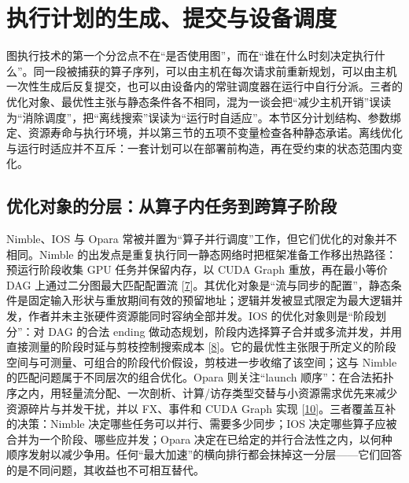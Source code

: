 \documentclass[
  UTF8,
  zihao=5]{ctexart}
\begin{document}
\hypertarget{ux6267ux884cux8ba1ux5212ux7684ux751fux6210ux63d0ux4ea4ux4e0eux8bbeux5907ux8c03ux5ea6}{%
\section{执行计划的生成、提交与设备调度}\label{ux6267ux884cux8ba1ux5212ux7684ux751fux6210ux63d0ux4ea4ux4e0eux8bbeux5907ux8c03ux5ea6}}

图执行技术的第一个分岔点不在``是否使用图''，而在``谁在什么时刻决定执行什么''。同一段被捕获的算子序列，可以由主机在每次请求前重新规划，可以由主机一次性生成后反复提交，也可以由设备内的常驻调度器在运行中自行分派。三者的优化对象、最优性主张与静态条件各不相同，混为一谈会把``减少主机开销''误读为``消除调度''，把``离线搜索''误读为``运行时自适应''。本节区分计划结构、参数绑定、资源寿命与执行环境，并以第三节的五项不变量检查各种静态承诺。离线优化与运行时适应并不互斥：一套计划可以在部署前构造，再在受约束的状态范围内变化。

\hypertarget{ux4f18ux5316ux5bf9ux8c61ux7684ux5206ux5c42ux4eceux7b97ux5b50ux5185ux4efbux52a1ux5230ux8de8ux7b97ux5b50ux9636ux6bb5}{%
\subsection{优化对象的分层：从算子内任务到跨算子阶段}\label{ux4f18ux5316ux5bf9ux8c61ux7684ux5206ux5c42ux4eceux7b97ux5b50ux5185ux4efbux52a1ux5230ux8de8ux7b97ux5b50ux9636ux6bb5}}

Nimble、IOS 与 Opara
常被并置为``算子并行调度''工作，但它们优化的对象并不相同。Nimble
的出发点是重复执行同一静态网络时把框架准备工作移出热路径：预运行阶段收集
GPU 任务并保留内存，以 CUDA Graph 重放，再在最小等价 DAG
上通过二分图最大匹配配置流
{[}\protect\hyperlink{ref-kwon2020nimble}{7}{]}。其优化对象是``流与同步的配置''，静态条件是固定输入形状与重放期间有效的预留地址；逻辑并发被显式限定为最大逻辑并发，作者并未主张硬件资源能同时容纳全部并发。IOS
的优化对象则是``阶段划分''：对 DAG 的合法 ending
做动态规划，阶段内选择算子合并或多流并发，并用直接测量的阶段时延与剪枝控制搜索成本
{[}\protect\hyperlink{ref-ding2021ios}{8}{]}。它的最优性主张限于所定义的阶段空间与可测量、可组合的阶段代价假设，剪枝进一步收缩了该空间；这与
Nimble 的匹配问题属于不同层次的组合优化。Opara 则关注``launch
顺序''：在合法拓扑序之内，用轻量流分配、一次剖析、计算/访存类型交替与小资源需求优先来减少资源碎片与并发干扰，并以
FX、事件和 CUDA Graph 实现
{[}\protect\hyperlink{ref-chen2025opara}{10}{]}。三者覆盖互补的决策：Nimble
决定哪些任务可以并行、需要多少同步；IOS
决定哪些算子应被合并为一个阶段、哪些应并发；Opara
决定在已给定的并行合法性之内，以何种顺序发射以减少争用。任何``最大加速''的横向排行都会抹掉这一分层------它们回答的是不同问题，其收益也不可相互替代。
\end{document}
